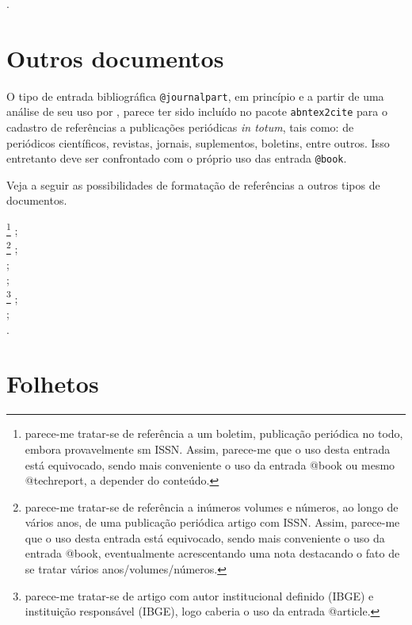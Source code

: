 \begin{apendicesenv}
{\small
	\cite{cruvinel1989}.\\
}



\section{Outros documentos}
\label{sec:Outrosdocs}


O tipo de entrada bibliográfica \verb|@journalpart|, em princípio e a partir de uma análise de seu uso por , parece ter sido incluído no pacote \texttt{abntex2cite} para o cadastro de referências a publicações periódicas \textit{in totum}, tais como: de periódicos científicos, revistas, jornais, suplementos, boletins, entre outros. Isso entretanto deve ser confrontado com o próprio uso das entrada \verb|@book|.

Veja a seguir as possibilidades de formatação de referências a outros tipos de documentos.

{\small
	\cite{boletim1965}\footnote{parece-me tratar-se de referência a um boletim, publicação periódica no todo, embora provavelmente sm ISSN. Assim, parece-me que o uso desta entrada está equivocado, sendo mais conveniente o uso da entrada {\ttfamily @book} ou mesmo {\ttfamily @techreport}, a depender do conteúdo.} ;\\
	\cite{febab1973}\footnote{parece-me tratar-se de referência a inúmeros volumes e números, ao longo de vários anos, de uma publicação periódica artigo com ISSN. Assim, parece-me que o uso desta entrada está equivocado, sendo mais conveniente o uso da entrada {\ttfamily @book}, eventualmente acrescentando uma nota destacando o fato de se tratar vários anos/volumes/números.} ;\\
	\cite{fgv1984} ;\\
	\cite{grafica1985} ;\\
	\cite{ibge1983} \footnote{parece-me tratar-se de artigo com autor institucional definido (IBGE) e instituição responsável (IBGE), logo caberia o uso da entrada {\ttfamily @article}.} ;\\
	\cite{industria1957} ;\\
	\cite{tres2000}.\\
}



\section{Folhetos}
\label{sec:booklets}



\end{apendicesenv}

